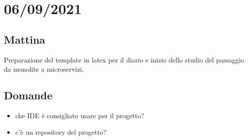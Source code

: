 \section{06/09/2021}
\subsection{Mattina}
Preparazione del template in latex per il diario e inizio dello studio del passaggio da monolite a microservizi.
\subsection{Domande}
\begin{itemize}
    \item che IDE è consigliato usare per il progetto?
    \item c'è un repository del progetto?
\end{itemize} 

